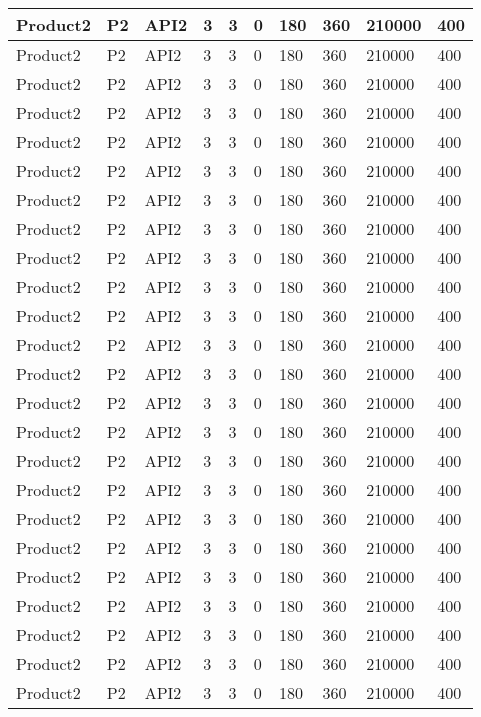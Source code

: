 \documentclass{article}
\begin{document}
\begin{longtable}[l]{|p{1.5cm}|p{1.7cm}|p{1cm}|p{1.5cm}|p{1.7cm}|p{1cm}|p{1cm}|p{1cm}|p{1cm}|p{1.5cm}|}
\hline
Product2 & P2 & API2 & 3 & 3 & 0 & 180 & 360 & 210000 & 400\\
\hline
Product2 & P2 & API2 & 3 & 3 & 0 & 180 & 360 & 210000 & 400\\
\hline
Product2 & P2 & API2 & 3 & 3 & 0 & 180 & 360 & 210000 & 400\\
\hline
Product2 & P2 & API2 & 3 & 3 & 0 & 180 & 360 & 210000 & 400\\
\hline
Product2 & P2 & API2 & 3 & 3 & 0 & 180 & 360 & 210000 & 400\\
\hline
Product2 & P2 & API2 & 3 & 3 & 0 & 180 & 360 & 210000 & 400\\
\hline
Product2 & P2 & API2 & 3 & 3 & 0 & 180 & 360 & 210000 & 400\\
\hline
Product2 & P2 & API2 & 3 & 3 & 0 & 180 & 360 & 210000 & 400\\
\hline
Product2 & P2 & API2 & 3 & 3 & 0 & 180 & 360 & 210000 & 400\\
\hline
Product2 & P2 & API2 & 3 & 3 & 0 & 180 & 360 & 210000 & 400\\
\hline
Product2 & P2 & API2 & 3 & 3 & 0 & 180 & 360 & 210000 & 400\\
\hline
Product2 & P2 & API2 & 3 & 3 & 0 & 180 & 360 & 210000 & 400\\
\hline
Product2 & P2 & API2 & 3 & 3 & 0 & 180 & 360 & 210000 & 400\\
\hline
Product2 & P2 & API2 & 3 & 3 & 0 & 180 & 360 & 210000 & 400\\
\hline
Product2 & P2 & API2 & 3 & 3 & 0 & 180 & 360 & 210000 & 400\\
\hline
Product2 & P2 & API2 & 3 & 3 & 0 & 180 & 360 & 210000 & 400\\
\hline
Product2 & P2 & API2 & 3 & 3 & 0 & 180 & 360 & 210000 & 400\\
\hline
Product2 & P2 & API2 & 3 & 3 & 0 & 180 & 360 & 210000 & 400\\
\hline
Product2 & P2 & API2 & 3 & 3 & 0 & 180 & 360 & 210000 & 400\\
\hline
Product2 & P2 & API2 & 3 & 3 & 0 & 180 & 360 & 210000 & 400\\
\hline
Product2 & P2 & API2 & 3 & 3 & 0 & 180 & 360 & 210000 & 400\\
\hline
Product2 & P2 & API2 & 3 & 3 & 0 & 180 & 360 & 210000 & 400\\
\hline
Product2 & P2 & API2 & 3 & 3 & 0 & 180 & 360 & 210000 & 400\\
\hline
Product2 & P2 & API2 & 3 & 3 & 0 & 180 & 360 & 210000 & 400\\

\end{longtable}
\end{document}
